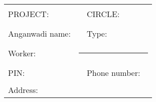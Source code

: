 \documentclass[12pt]{article}
\title{\heading}
\begin{document}
\Large
\doublespacing

\begin{tabular}{llll}
PROJECT: & \rule{2in}{0.5pt} & CIRCLE: & \rule{2in}{0.5pt} \\
Anganwadi name: & \rule{2in}{0.5pt} & Type: & \rule{2in}{0.5pt} \\
Worker: & \multicolumn{3}{l}{\rule{4in}{0.5pt}} \\
PIN: & \rule{2in}{0.5pt} & Phone number: & \rule{2in}{0.5pt} \\
Address: & \multicolumn{3}{l}{} \\
\end{tabular}
\end{document}
